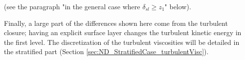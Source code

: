 (see the paragraph "in the general case where
$\delta_{sl} \geq z_1$" below).
\par
Finally, a large part of the differences shown here come from
the turbulent closure; having an explicit surface layer changes
the turbulent kinetic energy in the first level. The discretization
of the turbulent viscosities will be detailed in the stratified part
(Section \ref{sec:ND_StratifiedCase_turbulentVisc}).
